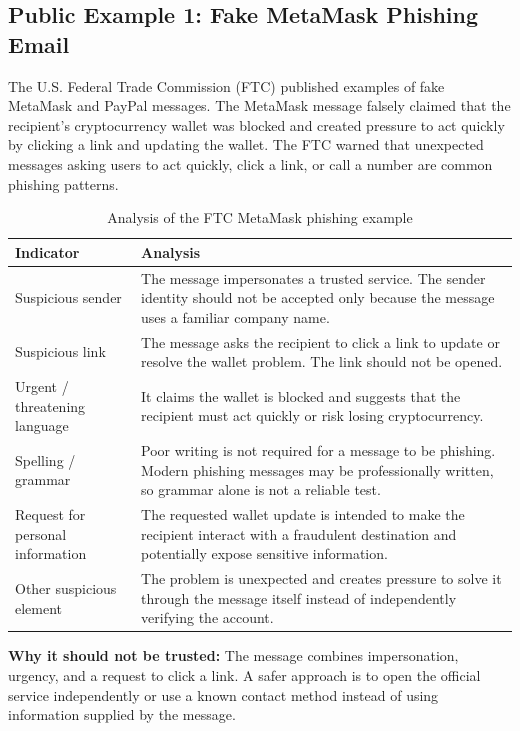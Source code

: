 \documentclass[12pt,a4paper]{article}
\begin{document}
\subsection{Public Example 1: Fake MetaMask Phishing Email}

The U.S. Federal Trade Commission (FTC) published examples of fake
MetaMask and PayPal messages. The MetaMask message falsely claimed that
the recipient's cryptocurrency wallet was blocked and created pressure
to act quickly by clicking a link and updating the wallet. The FTC
warned that unexpected messages asking users to act quickly, click a
link, or call a number are common phishing patterns.

\begin{table}[H]
\centering
\small
\renewcommand{\arraystretch}{1.35}
\begin{tabular}{|p{4.0cm}|p{9.2cm}|}
\hline
\textbf{Indicator} & \textbf{Analysis}\\
\hline
Suspicious sender & The message impersonates a trusted service. The sender identity should not be accepted only because the message uses a familiar company name.\\
\hline
Suspicious link & The message asks the recipient to click a link to update or resolve the wallet problem. The link should not be opened.\\
\hline
Urgent / threatening language & It claims the wallet is blocked and suggests that the recipient must act quickly or risk losing cryptocurrency.\\
\hline
Spelling / grammar & Poor writing is not required for a message to be phishing. Modern phishing messages may be professionally written, so grammar alone is not a reliable test.\\
\hline
Request for personal information & The requested wallet update is intended to make the recipient interact with a fraudulent destination and potentially expose sensitive information.\\
\hline
Other suspicious element & The problem is unexpected and creates pressure to solve it through the message itself instead of independently verifying the account.\\
\hline
\end{tabular}
\caption{Analysis of the FTC MetaMask phishing example}
\label{tab:metamask-analysis}
\end{table}

\textbf{Why it should not be trusted:} The message combines impersonation,
urgency, and a request to click a link. A safer approach is to open the
official service independently or use a known contact method instead of
using information supplied by the message.
\end{document}
